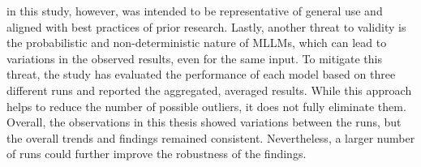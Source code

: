 in this study, however, was intended to be representative of 
general use and aligned with best practices of prior research.\newline 
Lastly, another threat to validity is the probabilistic and 
non-deterministic nature of MLLMs, which can lead to 
variations in the observed results, even for the same input.
To mitigate this threat, the 
study has evaluated the performance of each model 
based on three different runs and reported the aggregated, 
averaged results. While this approach helps to reduce the 
number of possible outliers, it does not fully eliminate 
them. Overall, the observations in this thesis showed variations 
between the runs, but the overall trends and findings 
remained consistent. Nevertheless, a larger number of 
runs could further improve the robustness of the findings.
